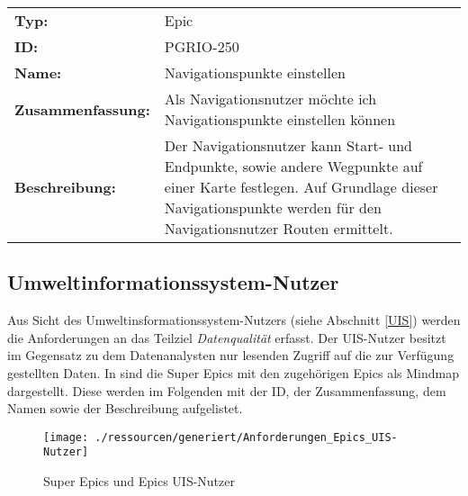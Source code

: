 		\begin{flushleft} 
\begin{tabular}{@{}lp{100mm}} 
\textbf{Typ:} & Epic \\ 
\textbf{ID:} & PGRIO-250 \\ 
\textbf{Name:} & Navigationspunkte einstellen \\ 
\textbf{Zusammenfassung:} & Als Navigationsnutzer möchte ich Navigationspunkte einstellen können \\ 
\textbf{Beschreibung:} & Der Navigationsnutzer kann Start- und Endpunkte, sowie andere Wegpunkte auf einer Karte festlegen. Auf Grundlage dieser Navigationspunkte werden für den Navigationsnutzer Routen ermittelt. \\ 
\end{tabular} 
\end{flushleft} 

\subsection{Umweltinformationssystem-Nutzer}
Aus Sicht des Umweltinsformationssystem-Nutzers (siehe Abschnitt \ref{UIS}) werden die Anforderungen an das Teilziel \textit{Datenqualität} erfasst. Der UIS-Nutzer besitzt im Gegensatz zu dem Datenanalysten nur lesenden Zugriff auf die zur Verfügung gestellten Daten. In  sind die Super Epics mit den zugehörigen Epics als Mindmap dargestellt. Diese werden im Folgenden mit der ID, der Zusammenfassung, dem Namen sowie der Beschreibung aufgelistet. 

\begin{figure}[H]
	\centering
	\texttt{[image: ./ressourcen/generiert/Anforderungen\_Epics\_UIS-Nutzer]}
	\caption{Super Epics und Epics UIS-Nutzer}
	\label{fig:UISNutzerEpics}
\end{figure}


